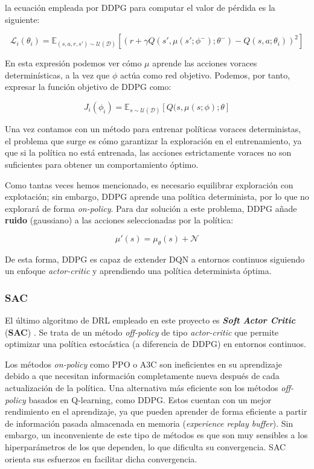 la ecuación empleada por DDPG para computar el valor de pérdida es la siguiente:

\begin{equation}
    \mathcal{L}_i(\theta_i) = \mathds{E}_{(s,a,r,s')\sim \mathcal{U}(\mathcal{D})}[(r+\gamma Q(s', \mu(s';\phi^-);\theta^-) - Q(s,a;\theta_i))^2]
\end{equation}

En esta expresión podemos ver cómo $\mu$ aprende las acciones voraces determinísticas, a la vez que $\phi$ actúa como red objetivo. Podemos, por tanto, expresar la función objetivo de DDPG como:

\begin{equation}
    J_i(\phi_i) = \mathds{E}_{s\sim \mathcal{U}(\mathcal{D})}[Q(s,\mu(s;\phi);\theta]
\end{equation}

Una vez contamos con un método para entrenar políticas voraces deterministas, el problema que surge es cómo garantizar la exploración en el entrenamiento, ya que si la política no está entrenada, las acciones estrictamente voraces no son suficientes para obtener un comportamiento óptimo. 

Como tantas veces hemos mencionado, es necesario equilibrar exploración con explotación; sin embargo, DDPG aprende una política determinista, por lo que no explorará de forma \textit{on-policy}. Para dar solución a este problema, DDPG añade \textbf{ruido} (gaussiano) a las acciones seleccionadas por la política:

\begin{equation}
    \mu'(s) = \mu_\theta(s) + \mathcal{N}
\end{equation}

De esta forma, DDPG es capaz de extender DQN a entornos continuos siguiendo un enfoque \textit{actor-critic} y aprendiendo una política determinista óptima.

\subsubsection{SAC}

El último algoritmo de DRL empleado en este proyecto es \textbf{\textit{Soft Actor Critic}} (\textbf{SAC}) \cite{haarnoja2018soft}. Se trata de un método \textit{off-policy} de tipo \textit{actor-critic} que permite optimizar una política estocástica (a diferencia de DDPG) en entornos continuos.

Los métodos \textit{on-policy} como PPO o A3C son ineficientes en su aprendizaje debido a que necesitan información completamente nueva después de cada actualización de la política. Una alternativa más eficiente son los métodos \textit{off-policy} basados en Q-learning, como DDPG. Estos cuentan con un mejor rendimiento en el aprendizaje, ya que pueden aprender de forma eficiente a partir de información pasada almacenada en memoria (\textit{experience replay buffer}). Sin embargo, un inconveniente de este tipo de métodos es que son muy sensibles a los hiperparámetros de los que dependen, lo que dificulta su convergencia. SAC orienta sus esfuerzos en facilitar dicha convergencia.


